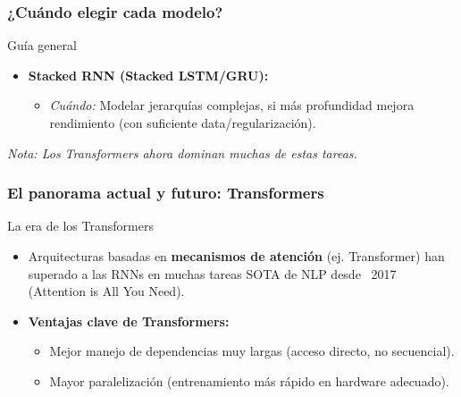 \documentclass[handout]{beamer}
\begin{document}
\begin{frame}
    \frametitle{¿Cuándo elegir cada modelo?}
    \begin{block}{Guía general}
        \begin{itemize}
             \item \textbf{Stacked RNN (Stacked LSTM/GRU):}
                  \begin{itemize}
                    \item \textit{Cuándo:} Modelar jerarquías complejas, si más profundidad mejora rendimiento (con suficiente data/regularización).
                  \end{itemize}
        \end{itemize}
         \bigskip \textit{Nota: Los Transformers ahora dominan muchas de estas tareas.}
    \end{block}
\end{frame}

\begin{frame}
    \frametitle{El panorama actual y futuro: Transformers}
    \begin{block}{La era de los Transformers}
        \begin{itemize}
            \item Arquitecturas basadas en \textbf{mecanismos de atención} (ej. Transformer) han superado a las RNNs en muchas tareas SOTA de NLP desde ~2017 (Attention is All You Need).
            \item \textbf{Ventajas clave de Transformers:}
                \begin{itemize}
                    \item Mejor manejo de dependencias muy largas (acceso directo, no secuencial).
                    \item Mayor paralelización (entrenamiento más rápido en hardware adecuado).
                \end{itemize}
        \end{itemize}
    \end{block}
\end{frame}
\end{document}
